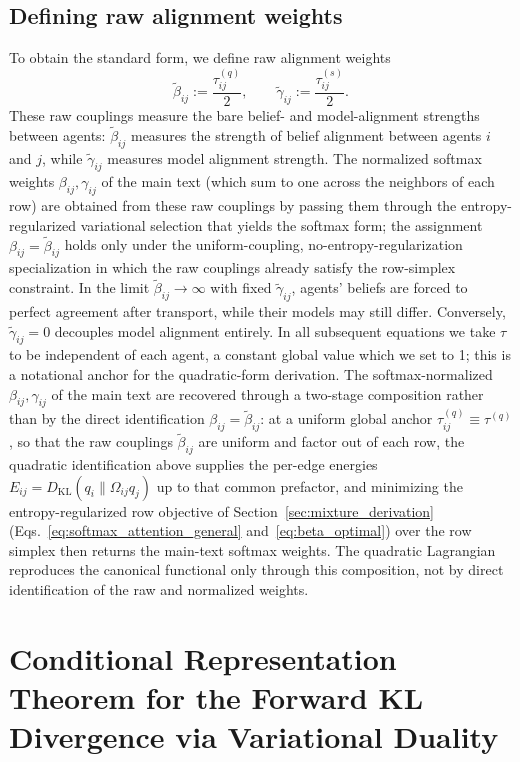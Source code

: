 \documentclass[11pt]{article}
\begin{document}
\subsection{Defining raw alignment weights}
\label{sec:raw_alignment_weights}
To obtain the standard form, we define raw alignment weights
\begin{equation}
\tilde\beta_{ij}:=\frac{\tau^{(q)}_{ij}}{2},
\qquad
\tilde\gamma_{ij}:=\frac{\tau^{(s)}_{ij}}{2}.
\end{equation}
These raw couplings measure the bare belief- and model-alignment strengths between agents: $\tilde\beta_{ij}$ measures the strength of belief alignment between agents $i$ and $j$, while $\tilde\gamma_{ij}$ measures model alignment strength. The normalized softmax weights $\beta_{ij}, \gamma_{ij}$ of the main text (which sum to one across the neighbors of each row) are obtained from these raw couplings by passing them through the entropy-regularized variational selection that yields the softmax form; the assignment $\beta_{ij} = \tilde\beta_{ij}$ holds only under the uniform-coupling, no-entropy-regularization specialization in which the raw couplings already satisfy the row-simplex constraint. In the limit $\tilde\beta_{ij} \to \infty$ with fixed $\tilde\gamma_{ij}$, agents' beliefs are forced to perfect agreement after transport, while their models may still differ. Conversely, $\tilde\gamma_{ij} = 0$ decouples model alignment entirely. In all subsequent equations we take $\tau$ to be independent of each agent, a constant global value which we set to 1; this is a notational anchor for the quadratic-form derivation. The softmax-normalized $\beta_{ij}, \gamma_{ij}$ of the main text are recovered through a two-stage composition rather than by the direct identification $\beta_{ij} = \tilde\beta_{ij}$: at a uniform global anchor $\tau^{(q)}_{ij} \equiv \tau^{(q)}$, so that the raw couplings $\tilde\beta_{ij}$ are uniform and factor out of each row, the quadratic identification above supplies the per-edge energies $E_{ij} = D_{\mathrm{KL}}(q_i \| \Omega_{ij}q_j)$ up to that common prefactor, and minimizing the entropy-regularized row objective of Section~\ref{sec:mixture_derivation} (Eqs.~\eqref{eq:softmax_attention_general} and~\eqref{eq:beta_optimal}) over the row simplex then returns the main-text softmax weights. The quadratic Lagrangian reproduces the canonical functional only through this composition, not by direct identification of the raw and normalized weights.

\section*{Conditional Representation Theorem for the Forward KL Divergence via Variational Duality}
\label{app:conditional_representation}
\end{document}
